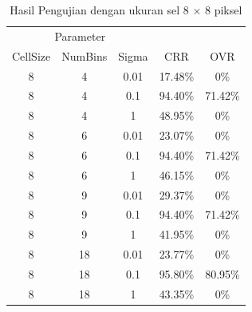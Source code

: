 \begin{longtable}[c]{|c|c|c|c|c|}
	\caption{Hasil Pengujian dengan ukuran sel 8 $\times$ 8 piksel}
	\label{tab:HasilPengujianSel8}\\
	\hline
	\multicolumn{3}{|c|}{Parameter} &                                &                                \\ \cline{1-3}
	CellSize   & NumBins   & Sigma  & \multirow{-2}{*}{CRR}          & \multirow{-2}{*}{OVR}          \\ \hline
	\endhead
	8          & 4         & 0.01   & 17.48\%                        & 0\% \\ \hline
	8          & 4         & 0.1    & 94.40\%                        & 71.42\%                            \\ \hline
	8          & 4         & 1      & 48.95\%                        & 0\%                            \\ \hline
	8          & 6         & 0.01   & 23.07\%                        & 0\%                         \\ \hline
	8          & 6         & 0.1    & 94.40\%                        & 71.42\%                            \\ \hline
	8          & 6         & 1      & 46.15\%                        & 0\%                            \\ \hline
	8          & 9         & 0.01   & 29.37\%                        & 0\% \\ \hline
	8          & 9         & 0.1    & 94.40\%                        & 71.42\%                            \\ \hline
	8          & 9         & 1      & 41.95\%                        & 0\%                            \\ \hline
	8          & 18        & 0.01   & 23.77\%                        & 0\%                         \\ \hline
	8          & 18        & 0.1    & {\color[HTML]{FE0000} 95.80\%} & {\color[HTML]{FE0000} 80.95\%}                            \\ \hline
	8          & 18        & 1      & 43.35\%                        & 0\%                            \\ \hline
\end{longtable}
